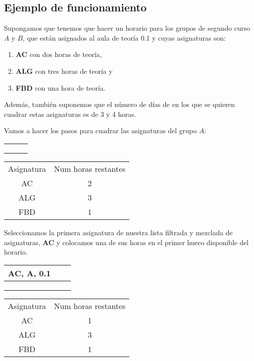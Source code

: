 \subsection{Ejemplo de funcionamiento}
Supongamos que tenemos que hacer un horario para los grupos de segundo curso $A$ y $B$, que están asignados al aula de teoría 0.1 y cuyas asignaturas son:

\begin{enumerate}[$\bullet$]
    \item \textbf{AC} con dos horas de teoría,
    \item \textbf{ALG} con tres horas de teoría y
    \item \textbf{FBD} con una hora de teoría.
\end{enumerate}

Además, también suponemos que el número de días de en los que se quieren cuadrar estas asignaturas es de 3 y 4 horas.

Vamos a hacer los pasos para cuadrar las asignaturas del grupo $A$:

\begin{minipage}{0.5\textwidth}    
\begin{tabular}{| c | c | c |}
\hline
 &  &  \\
 \hline
 &  &  \\
 \hline
 &  &  \\
 \hline
 &  &  \\
 \hline 
\end{tabular}
\end{minipage}
\begin{minipage}{0.5\textwidth}
\begin{tabular}{c | c}
Asignatura & Num horas restantes \\
AC & 2 \\
ALG & 3 \\
FBD & 1
\end{tabular}
\end{minipage}

Seleccionamos la primera asignatura de nuestra lista filtrada y mezclada de asignaturas, \textbf{AC} y colocamos una de sus horas en el primer hueco disponible del horario. 

\begin{minipage}{0.5\textwidth}    
\begin{tabular}{| c | c | c |}
\hline
AC, A, 0.1 &  &  \\
 \hline
 &  &  \\
 \hline
 &  &  \\
 \hline
 &  &  \\
 \hline 
\end{tabular}
\end{minipage}
\begin{minipage}{0.5\textwidth}
\begin{tabular}{c | c}
Asignatura & Num horas restantes \\
AC & 1 \\
ALG & 3 \\
FBD & 1
\end{tabular}
\end{minipage}

